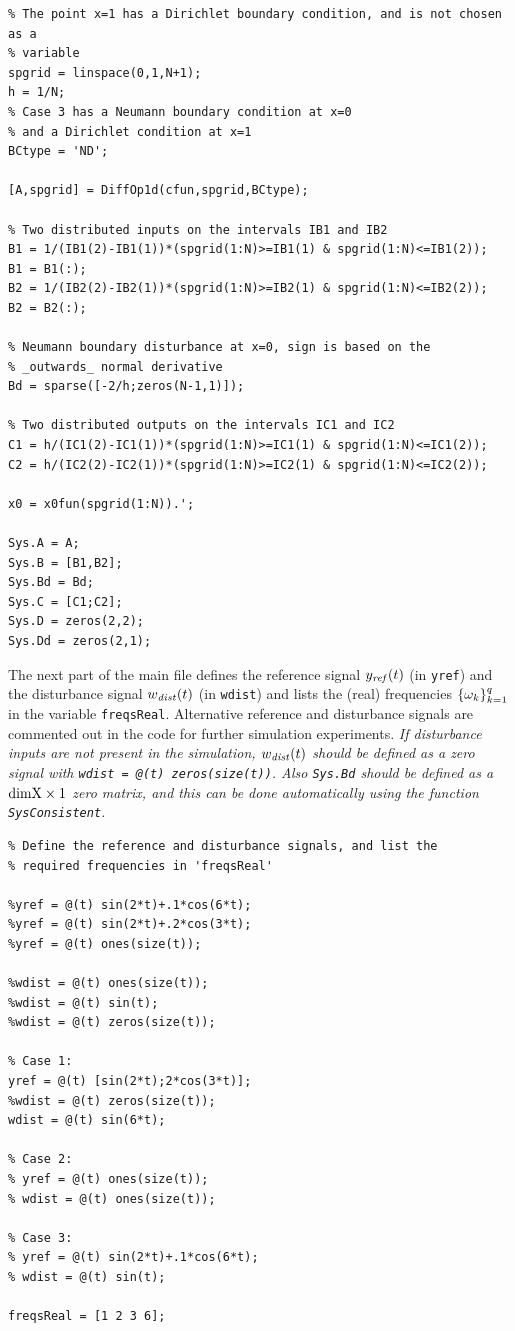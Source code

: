 \documentclass[11pt, a4paper]{amsart}
\theoremstyle{definition}
\numberwithin{equation}{section}
\newcommand{\yref}{y_{\mbox{\scriptsize\textit{ref}}}}
\newcommand{\wdist}{w_{\mbox{\scriptsize\textit{dist}}}}
\begin{document}
\begin{lstlisting}
% The point x=1 has a Dirichlet boundary condition, and is not chosen as a
% variable
spgrid = linspace(0,1,N+1);
h = 1/N;
% Case 3 has a Neumann boundary condition at x=0
% and a Dirichlet condition at x=1
BCtype = 'ND';

[A,spgrid] = DiffOp1d(cfun,spgrid,BCtype);

% Two distributed inputs on the intervals IB1 and IB2
B1 = 1/(IB1(2)-IB1(1))*(spgrid(1:N)>=IB1(1) & spgrid(1:N)<=IB1(2));
B1 = B1(:);
B2 = 1/(IB2(2)-IB2(1))*(spgrid(1:N)>=IB2(1) & spgrid(1:N)<=IB2(2));
B2 = B2(:);

% Neumann boundary disturbance at x=0, sign is based on the
% _outwards_ normal derivative
Bd = sparse([-2/h;zeros(N-1,1)]); 

% Two distributed outputs on the intervals IC1 and IC2
C1 = h/(IC1(2)-IC1(1))*(spgrid(1:N)>=IC1(1) & spgrid(1:N)<=IC1(2));
C2 = h/(IC2(2)-IC2(1))*(spgrid(1:N)>=IC2(1) & spgrid(1:N)<=IC2(2));

x0 = x0fun(spgrid(1:N)).';

Sys.A = A;
Sys.B = [B1,B2];
Sys.Bd = Bd;
Sys.C = [C1;C2];
Sys.D = zeros(2,2);
Sys.Dd = zeros(2,1);
  \end{lstlisting}

The next part of the main file defines the reference signal $\yref(t)$ (in \texttt{yref}) and the disturbance signal $\wdist(t)$ (in \texttt{wdist}) and lists the (real) frequencies $\{\omega_k\}_{k=1}^q$ in the variable \texttt{freqsReal}. Alternative reference and disturbance signals are commented out in the code for further simulation experiments.
\emph{If disturbance inputs are not present in the simulation, $\wdist(t)$ should be defined as a zero signal with \textup{\texttt{wdist = @(t) zeros(size(t))}}. Also \textup{\texttt{Sys.Bd}} should be defined as a $\textup{dimX}\times 1$ zero matrix, and this can be done automatically using the function \textup{\texttt{SysConsistent}}.}

\begin{lstlisting}
% Define the reference and disturbance signals, and list the
% required frequencies in 'freqsReal'

%yref = @(t) sin(2*t)+.1*cos(6*t);
%yref = @(t) sin(2*t)+.2*cos(3*t);
%yref = @(t) ones(size(t));

%wdist = @(t) ones(size(t));
%wdist = @(t) sin(t);
%wdist = @(t) zeros(size(t));

% Case 1:
yref = @(t) [sin(2*t);2*cos(3*t)];
%wdist = @(t) zeros(size(t));
wdist = @(t) sin(6*t);

% Case 2:
% yref = @(t) ones(size(t));
% wdist = @(t) ones(size(t));

% Case 3:
% yref = @(t) sin(2*t)+.1*cos(6*t);
% wdist = @(t) sin(t);

freqsReal = [1 2 3 6];
\end{lstlisting}
\end{document}
